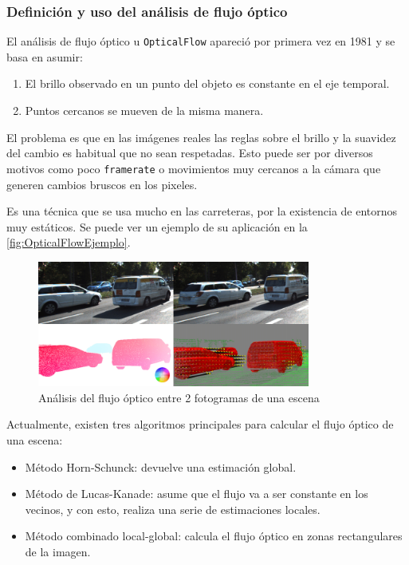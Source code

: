 \subsubsection{Definición y uso del análisis de flujo óptico}

El análisis de flujo óptico u \texttt{OpticalFlow} apareció por primera vez en 1981\cite{hornDeterminingOpticalFlow1981} y se basa en asumir:

\begin{enumerate}
    \item El brillo observado en un punto del objeto es constante en el eje temporal.
    \item Puntos cercanos se mueven de la misma manera.
\end{enumerate}

El problema es que en las imágenes reales las reglas sobre el brillo y la suavidez del cambio es habitual que no sean respetadas. Esto puede ser por diversos motivos como poco \texttt{framerate} o movimientos 
muy cercanos a la cámara que generen cambios bruscos en los pixeles.

Es una técnica que se usa mucho en las carreteras, por la existencia de entornos muy estáticos. Se puede ver un ejemplo de su aplicación en la \autoref{fig:OpticalFlowEjemplo}.

\begin{figure}[H]
    \centering
    \includegraphics[width=0.8\textwidth]{images/4/OpticalFlow.png}
    \caption{Análisis del flujo óptico entre 2 fotogramas de una escena\cite{schusterCombiningStereoDisparity2018}}
    \label{fig:OpticalFlowEjemplo}
\end{figure}

Actualmente, existen tres algoritmos principales para calcular el flujo óptico de una escena:

\begin{itemize}
    \item Método Horn-Schunck: devuelve una estimación global.
    \item Método de Lucas-Kanade: asume que el flujo va a ser constante en los vecinos, y con esto, realiza una serie de estimaciones locales.
    \item Método combinado local-global: calcula el flujo óptico en zonas rectangulares de la imagen.
\end{itemize}

